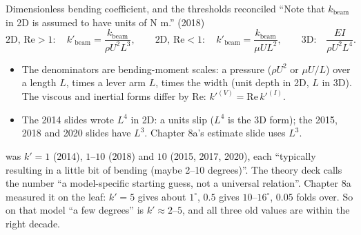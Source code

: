 \documentclass[aspectratio=169,11pt]{beamer}
\begin{document}
\begin{frame}{Dimensionless bending coefficient, and the thresholds reconciled}
\label{fr:kbeam}
\small ``Note that $k_{\mathrm{beam}}$ in 2D is assumed to have units of N m.'' (2018)
\[
  \text{2D, } \mathrm{Re} > 1:\quad k'_{\mathrm{beam}} = \frac{k_{\mathrm{beam}}}{\rho U^2 L^3}, \qquad
  \text{2D, } \mathrm{Re} < 1:\quad k'_{\mathrm{beam}} = \frac{k_{\mathrm{beam}}}{\mu U L^2}, \qquad
  \text{3D:}\quad \frac{EI}{\rho U^2 L^4}.
\]
\begin{itemize}
  \item The denominators are bending-moment scales: a pressure ($\rho U^2$ or $\mu U/L$) over a length $L$, times a lever arm $L$, times the width (unit depth in 2D, $L$ in 3D). The viscous and inertial forms differ by $\mathrm{Re}$: $k'^{(V)} = \mathrm{Re}\,k'^{(I)}$.
  \item The 2014 slides wrote $L^4$ in 2D: a units slip ($L^4$ is the 3D form); the 2015, 2018 and 2020 slides have $L^3$. Chapter 8a's estimate slide uses $L^3$.
\end{itemize}
\vspace{1mm}
\begin{punchbox}
\small {} was $k' = 1$ (2014), $1$--$10$ (2018) and $10$ (2015, 2017, 2020), each ``typically resulting in a little bit of bending (maybe 2--10 degrees)''. The theory deck calls the number ``a model-specific starting guess, not a universal relation''. Chapter 8a measured it on the leaf: $k' = 5$ gives about $1^\circ$, $0.5$ gives $10$--$16^\circ$, $0.05$ folds over. So on that model ``a few degrees'' is $k' \approx 2$--$5$, and all three old values are within the right decade.
\end{punchbox}
\end{frame}
\end{document}
